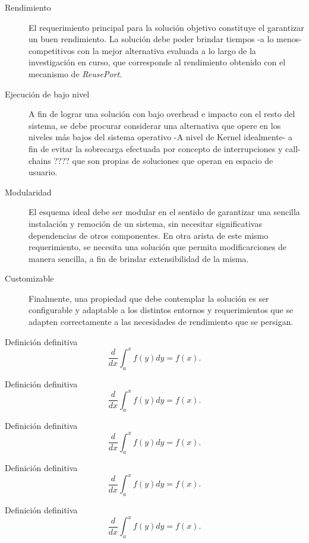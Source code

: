 \begin{description}
\item[Rendimiento] El requerimiento principal para la solución objetivo constituye el garantizar un buen rendimiento. La solución debe poder brindar tiempos -a lo menos- competitivos con la mejor alternativa evaluada a lo largo de la investigación en curso, que corresponde al rendimiento obtenido con el mecanismo de \emph{ReusePort}.
\item[Ejecución de bajo nivel] A fin de lograr una solución con bajo overhead e impacto con el resto del sistema, se debe procurar considerar una alternativa que opere en los niveles más bajos del sistema operativo -A nivel de Kernel idealmente- a fin de evitar la sobrecarga efectuada por concepto de interrupciones y call-chains ???? que son propias de soluciones que operan en espacio de usuario.
\item[Modularidad] El esquema ideal debe ser modular en el sentido de garantizar una sencilla instalación y remoción de un sistema, sin necesitar significativas dependencias de otros componentes. En otra arista de este mismo requerimiento, se necesita una solución que permita modificarciones de manera sencilla, a fin de brindar extensibilidad de la misma.
\item[Customizable] Finalmente, una propiedad que debe contemplar la solución es ser configurable y adaptable a los distintos entornos y requerimientos que se adapten correctamente a las necesidades de rendimiento que se persigan.
\end{description}

\begin{defn} Definición definitiva $$\frac{d}{dx}\int_a^xf(y)dy=f(x).$$\end{defn}

\begin{teo} Definición definitiva $$\frac{d}{dx}\int_a^xf(y)dy=f(x).$$\end{teo}

\begin{prop} Definición definitiva $$\frac{d}{dx}\int_a^xf(y)dy=f(x).$$\end{prop}

\begin{obs} Definición definitiva $$\frac{d}{dx}\int_a^xf(y)dy=f(x).$$\end{obs}

\begin{ej} Definición definitiva $$\frac{d}{dx}\int_a^xf(y)dy=f(x).$$\end{ej}